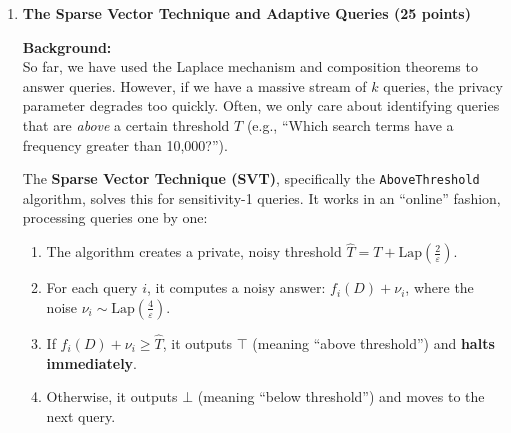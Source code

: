 \documentclass[12pt]{article}
\begin{document}
\begin{enumerate}
\begin{solution}
\begin{enumerate}
\textbf{2. Noise Distributions (Basic Composition):} \\
To achieve an overall privacy budget of $\varepsilon$, and splitting it evenly, each query receives a budget of $\varepsilon_i = \frac{\varepsilon}{2}$. 
The Laplace mechanism adds noise drawn from $\text{Lap}(\frac{\Delta}{\varepsilon_i})$.
\begin{itemize}
    \item For $q_1$, the noise added is drawn from: $Y_1 \sim \text{Lap}\left(\frac{1}{\varepsilon / 2}\right) = \text{Lap}\left(\frac{2}{\varepsilon}\right)$
    \item For $q_2$, the noise added is drawn from: $Y_2 \sim \text{Lap}\left(\frac{150}{\varepsilon / 2}\right) = \text{Lap}\left(\frac{300}{\varepsilon}\right)$
\end{itemize}
\textit{(Points: 2 for $\Delta q_1=1$, 2 for $\Delta q_2=150$, 2 for identifying the sub-budget $\varepsilon/2$, 2 for the correct $q_1$ noise distribution, 2 for the correct $q_2$ noise distribution.)}


\end{enumerate}

\end{solution}

\begin{problem}
    \newpage
    {\bf extra sheet}
    \newpage
\end{problem}
\item {\bf The Sparse Vector Technique and Adaptive Queries (25 points)}

\textbf{Background:} \\
So far, we have used the Laplace mechanism and composition theorems to answer queries. However, if we have a massive stream of $k$ queries, the privacy parameter degrades too quickly. Often, we only care about identifying queries that are \textit{above} a certain threshold $T$ (e.g., ``Which search terms have a frequency greater than 10,000?''). 

The \textbf{Sparse Vector Technique (SVT)}, specifically the \texttt{AboveThreshold} algorithm, solves this for sensitivity-1 queries. It works in an ``online'' fashion, processing queries one by one:
\begin{enumerate}
    \item The algorithm creates a private, noisy threshold $\hat{T} = T + \text{Lap}\left(\frac{2}{\varepsilon}\right)$.
    \item For each query $i$, it computes a noisy answer: $f_i(D) + \nu_i$, where the noise $\nu_i \sim \text{Lap}\left(\frac{4}{\varepsilon}\right)$.
    \item If $f_i(D) + \nu_i \ge \hat{T}$, it outputs $\top$ (meaning ``above threshold'') and \textbf{halts immediately}.
    \item Otherwise, it outputs $\bot$ (meaning ``below threshold'') and moves to the next query.
\end{enumerate}


\end{enumerate}
\end{document}
